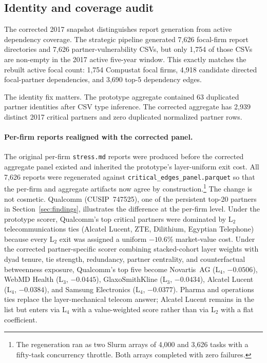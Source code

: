 \documentclass[11pt,letterpaper]{article}
\begin{document}
\subsection{Identity and coverage audit}

The corrected 2017 snapshot distinguishes report generation from
active dependency coverage.  The strategic pipeline generated 7{,}626
focal-firm report directories and 7{,}626 partner-vulnerability CSVs,
but only 1{,}754 of those CSVs are non-empty in the 2017 active
five-year window.  This exactly matches the rebuilt active focal count:
1{,}754 Compustat focal firms, 4{,}918 candidate directed
focal-partner dependencies, and 3{,}690 top-5 dependency edges.

The identity fix matters.  The prototype aggregate contained 63
duplicated partner identities after CSV type inference.  The corrected
aggregate has 2{,}939 distinct 2017 critical partners and zero
duplicated normalized partner rows.

\paragraph{Per-firm reports realigned with the corrected panel.}
The original per-firm \texttt{stress.md} reports were produced before
the corrected aggregate panel existed and inherited the prototype's
layer-uniform exit cost.  All 7{,}626 reports were regenerated against
\texttt{critical\_edges\_panel.parquet} so that the per-firm and
aggregate artifacts now agree by construction.\footnote{The
  regeneration ran as two Slurm arrays of 4{,}000 and 3{,}626 tasks
  with a fifty-task concurrency throttle.  Both arrays completed with
  zero failures.}  The change is not cosmetic.  Qualcomm
(CUSIP~747525), one of the persistent top-20 partners in
Section~\ref{sec:findings}, illustrates the difference at the
per-firm level.  Under the prototype scorer, Qualcomm's top critical
partners were dominated by L$_2$ telecommunications ties (Alcatel
Lucent, ZTE, Dilithium, Egyptian Telephone) because every L$_2$
exit was assigned a uniform $-10.6\%$ market-value cost.  Under the
corrected partner-specific scorer combining stacked-cohort layer
weights with dyad tenure, tie strength, redundancy, partner centrality,
and counterfactual betweenness exposure, Qualcomm's top five become
Novartis~AG (L$_4$, $-0.0506$), WebMD Health (L$_3$, $-0.0445$),
GlaxoSmithKline (L$_3$, $-0.0434$), Alcatel Lucent (L$_4$, $-0.0384$),
and Samsung Electronics (L$_4$, $-0.0377$).  Pharma and operations
ties replace the layer-mechanical telecom answer; Alcatel Lucent
remains in the list but enters via L$_4$ with a value-weighted score
rather than via L$_2$ with a flat coefficient.
\end{document}
